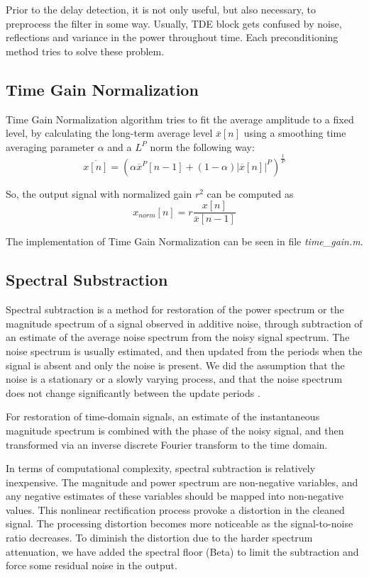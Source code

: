 Prior to the delay detection, it is not only useful, but also necessary, to preprocess the filter in some way. Usually, TDE block gets confused by noise, reflections and variance in the power throughout time. Each preconditioning method tries to solve these problem.
\subsection{Time Gain Normalization}
  Time Gain Normalization algorithm tries to fit the average amplitude to a fixed level, by calculating the long-term average level $\overline{x}[n]$ using a smoothing time averaging parameter $\alpha$ and a $L^P$ norm the following way:
  $$ \overline{x[n]} = (\alpha \overline{x}^P[n-1] + (1-\alpha) |\overline{x}[n]|^P ) ^{\frac{1}{P}} $$
  
  So, the output signal with normalized gain $r^2$ can be computed as
  $$ x_{norm}[n] = r \frac{x[n]}{\overline{x}[n-1]} $$
  
  The implementation of Time Gain Normalization can be seen in file \emph{time\_gain.m}\cite{timegain}.
  
\subsection{Spectral Substraction}
  Spectral subtraction is a method for restoration of the power spectrum or the magnitude spectrum of a signal observed in additive noise, through subtraction of an estimate of the average noise spectrum from the noisy signal spectrum. The noise spectrum is usually estimated, and then updated from the periods when the signal is absent and only the noise is present. We did the assumption that the noise is a stationary or a slowly varying process, and that the noise spectrum does not change significantly between the update periods \cite{speech}. 

  For restoration of time-domain signals, an estimate of the instantaneous magnitude spectrum is combined with the phase of the noisy signal, and then transformed via an inverse discrete Fourier transform to the time domain. 

  In terms of computational complexity, spectral subtraction is relatively inexpensive. The magnitude and power spectrum are non-negative variables, and any negative estimates of these variables should be mapped into non-negative values. This nonlinear rectification process provoke a distortion in the cleaned signal. The processing distortion becomes more noticeable as the signal-to-noise ratio decreases. To diminish the distortion due to the harder spectrum attenuation, we have added the spectral floor (Beta) to limit the subtraction and force some residual noise in the output.
  
